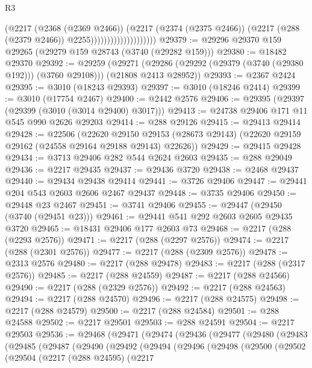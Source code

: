 \begin{lexlean}{R3}
\begin{coremodule}
                                      (@2217
                                        (@2368 (@2369 @2466))
                                        (@2217
                                          (@2374 (@2375 @2466))
                                          (@2217 (@288 (@2379 @2466)) @2255))))))))))))))))))))
@29379 := @29296 @29370 @159 @29265 (@29279 @159 @28743 (@3740 (@29282 @159)))
@29380 := @18482 @29370
@29392 := @29259
    (@29271 (@29286 (@29292 (@29379 (@3740 (@29380 @192))) (@3760 @29108))) (@21808 @2413 @28952))
@29393 := @2367 @2424
@29395 := @3010 (@18243 @29393)
@29397 := @3010 (@18246 @2414)
@29399 := @3010 (@17754 @2467)
@29400 := @2442 @2576
@29406 := @29395 (@29397 (@29399 (@3010 (@3014 @29400) @3017)))
@29413 := @24738 @29406 @171 @11 @545 @990 @2626 @29203
@29414 := @288 @29126
@29415 := @29413 @29414
@29428 := @22506
    (@22620
      @29150
      @29153
      (@28673 @29143)
      (@22620 @29159 @29162 (@24558 @29164 @29188 @29143) @22626))
@29429 := @29415 @29428
@29434 := @3713 @29406 @282 @544 @2624 @2603
@29435 := @288 @29049
@29436 := @2217 @29435
@29437 := @29436 @3720
@29438 := @2468 @29437
@29440 := @29434 @29438 @29414
@29441 := @3726 @29406
@29447 := @29441 @204 @543 @2603 @2606 @2467 @29437
@29448 := @3735 @29406
@29450 := @29448 @23 @2467
@29451 := @3741 @29406
@29455 := @29447 (@29450 (@3740 (@29451 @23)))
@29461 := @29441 @541 @292 @2603 @2605 @29435 @3720
@29465 := @18431 @29406 @177 @2603 @73
@29468 := @2217 (@288 (@2293 @2576))
@29471 := @2217 (@288 (@2297 @2576))
@29474 := @2217 (@288 (@2301 @2576))
@29477 := @2217 (@288 (@2309 @2576))
@29478 := @2313 @2576
@29480 := @2217 (@288 @29478)
@29483 := @2217 (@288 (@2317 @2576))
@29485 := @2217 (@288 @24559)
@29487 := @2217 (@288 @24566)
@29490 := @2217 (@288 (@2329 @2576))
@29492 := @2217 (@288 @24563)
@29494 := @2217 (@288 @24570)
@29496 := @2217 (@288 @24575)
@29498 := @2217 (@288 @24579)
@29500 := @2217 (@288 @24584)
@29501 := @288 @24588
@29502 := @2217 @29501
@29503 := @288 @24591
@29504 := @2217 @29503
@29536 := @29468
    (@29471
      (@29474
        (@29436
          (@29477
            (@29480
              (@29483
                (@29485
                  (@29487
                    (@29490
                      (@29492
                        (@29494
                          (@29496
                            (@29498
                              (@29500
                                (@29502
                                  (@29504
                                    (@2217
                                      (@288 @24595)
                                      (@2217

\end{coremodule}
\end{lexlean}
